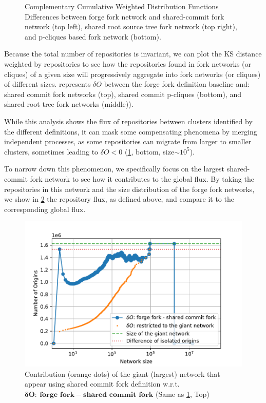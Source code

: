 \begin{figure}
\begin{subfigure}{.45\textwidth}
    \end{subfigure}
    \caption{Complementary Cumulative Weighted Distribution Functions
    Differences between forge fork network and shared-commit fork network
    (top left), shared root source tree fork network (top right), and p-cliques
    based fork network (bottom).}
    \label{fig:fork-flux-gh-rev_rootdir_pcliques}
\end{figure}

Because the total number of repositories is invariant, we can plot the KS
distance weighted by repositories to see how the repositories found in fork
networks (or cliques) of a given size will progressively aggregate into fork
networks (or cliques) of different sizes.
 represents $\delta O$ between
the forge fork definition baseline and: shared commit fork networks (top),
shared commit p-cliques (bottom), and shared root tree fork networks (middle)).

While this analysis shows the flux of repositories between clusters identified
by the different definitions, it can mask some compensating phenomena by
merging independent processes, as some repositories can migrate from larger to
smaller clusters,
sometimes leading to $\delta O<0$
(\cref{fig:fork-flux-gh-rev_rootdir_pcliques}, bottom, size$\sim10^5$).

To narrow down this phenomenon, we specifically focus on the
largest shared-commit fork network to see how it contributes to the global
flux. By taking the repositories in this network and the size
distribution of the forge fork networks, we show in \cref{fig:fork-Diff_WCCDF_all}
the repository flux, as defined above, and compare it to the corresponding
global flux.

\begin{figure}
    \centering
    \includegraphics[width=0.7\linewidth]{img/forks/gr/Diff_WCCDF_all.pdf}
    \caption{Contribution (orange dots) of the giant (largest) network that
    appear using shared commit fork definition w.r.t.
    $\mathbf{\boldsymbol{\delta} O:}~\textbf{forge~fork} - \textbf{shared~commit~fork}$ (Same as
    \cref{fig:fork-flux-gh-rev_rootdir_pcliques}, Top)}
    \label{fig:fork-Diff_WCCDF_all}
\end{figure}

